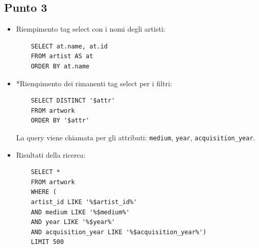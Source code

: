 \documentclass{ol-softwaremanual}
\begin{document}
\subsection{Punto 3}
\begin{itemize}
    \item Riempimento tag select con i nomi degli artisti:
    \begin{verbatim}
    SELECT at.name, at.id
    FROM artist AS at
    ORDER BY at.name
    \end{verbatim}
    \item *Riempimento dei rimanenti tag select per i filtri:
    \begin{verbatim}
    SELECT DISTINCT '$attr' 
    FROM artwork
    ORDER BY '$attr'
    \end{verbatim}
    La query viene chiamata per gli attributi: \verb|medium|, \verb|year|, \verb|acquisition_year|.
    \item Risultati della ricerca:
    \begin{verbatim}
    SELECT *
    FROM artwork
    WHERE (
    artist_id LIKE '%$artist_id%' 
    AND medium LIKE '%$medium%'
    AND year LIKE '%$year%'
    AND acquisition_year LIKE '%$acquisition_year%')
    LIMIT 500
    \end{verbatim}
\end{itemize}

\newpage
\end{document}
